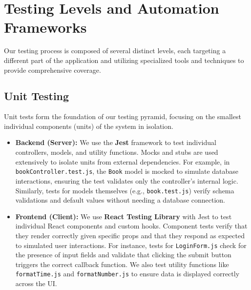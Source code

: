 \section{Testing Levels and Automation Frameworks}
\label{sec:testing_levels}
Our testing process is composed of several distinct levels, each targeting a different part of the application and utilizing specialized tools and techniques to provide comprehensive coverage.

\subsection{Unit Testing}
\label{subsec:unit_testing}
Unit tests form the foundation of our testing pyramid, focusing on the smallest individual components (units) of the system in isolation.
\begin{itemize}
    \item \textbf{Backend (Server):} We use the \textbf{Jest} framework to test individual controllers, models, and utility functions. Mocks and stubs are used extensively to isolate units from external dependencies. For example, in \texttt{bookController.test.js}, the \texttt{Book} model is mocked to simulate database interactions, ensuring the test validates only the controller's internal logic. Similarly, tests for models themselves (e.g., \texttt{book.test.js}) verify schema validations and default values without needing a database connection.
    
    \item \textbf{Frontend (Client):} We use \textbf{React Testing Library} with Jest to test individual React components and custom hooks. Component tests verify that they render correctly given specific props and that they respond as expected to simulated user interactions. For instance, tests for \texttt{LoginForm.js} check for the presence of input fields and validate that clicking the submit button triggers the correct callback function. We also test utility functions like \texttt{formatTime.js} and \texttt{formatNumber.js} to ensure data is displayed correctly across the UI.
\end{itemize}

